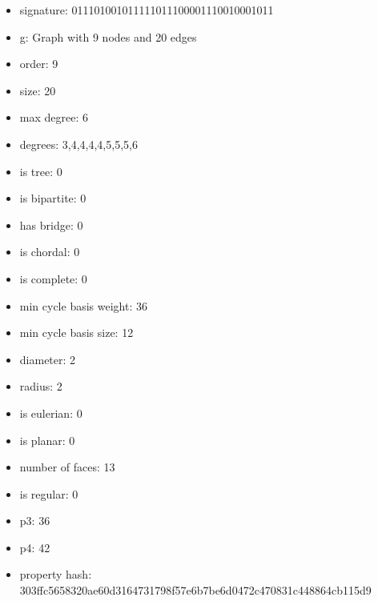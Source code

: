 \newpage
\begin{figure}
\end{figure}
\begin{itemize}
\item signature: 011101001011111011100001110010001011
\item g: Graph with 9 nodes and 20 edges
\item order: 9
\item size: 20
\item max degree: 6
\item degrees: 3,4,4,4,4,5,5,5,6
\item is tree: 0
\item is bipartite: 0
\item has bridge: 0
\item is chordal: 0
\item is complete: 0
\item min cycle basis weight: 36
\item min cycle basis size: 12
\item diameter: 2
\item radius: 2
\item is eulerian: 0
\item is planar: 0
\item number of faces: 13
\item is regular: 0
\item p3: 36
\item p4: 42
\item property hash: 303ffc5658320ae60d3164731798f57e6b7be6d0472c470831c448864cb115d9
\end{itemize}
